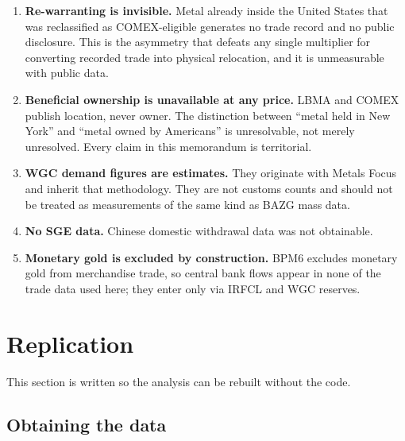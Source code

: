 \documentclass[11pt,a4paper]{article}
\begin{document}
\begin{enumerate}[leftmargin=*]
\item \textbf{Re-warranting is invisible.} Metal already inside the United States that was
reclassified as COMEX-eligible generates no trade record and no public disclosure. This is the
asymmetry that defeats any single multiplier for converting recorded trade into physical
relocation, and it is unmeasurable with public data.

\item \textbf{Beneficial ownership is unavailable at any price.} LBMA and COMEX publish
location, never owner. The distinction between ``metal held in New York'' and ``metal owned by
Americans'' is unresolvable, not merely unresolved. Every claim in this memorandum is
territorial.

\item \textbf{WGC demand figures are estimates.} They originate with Metals Focus and inherit
that methodology. They are not customs counts and should not be treated as measurements of the
same kind as BAZG mass data.

\item \textbf{No SGE data.} Chinese domestic withdrawal data was not obtainable.

\item \textbf{Monetary gold is excluded by construction.} BPM6 excludes monetary gold from
merchandise trade, so central bank flows appear in none of the trade data used here; they enter
only via IRFCL and WGC reserves.

\end{enumerate}

\section{Replication}
\label{sec:replication}

This section is written so the analysis can be rebuilt without the code.

\subsection{Obtaining the data}
\end{document}
